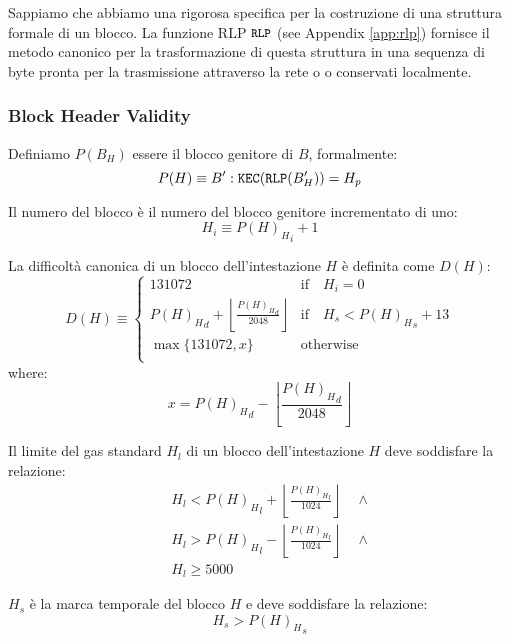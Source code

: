 \documentclass[9pt,oneside]{amsart}
\begin{document}
\begin{multicols}{2}
Sappiamo che abbiamo una rigorosa specifica per la costruzione di una struttura formale di un blocco. La funzione RLP $\texttt{\small RLP}$ (see Appendix \ref{app:rlp}) fornisce il metodo canonico per la trasformazione di questa struttura in una sequenza di byte pronta per la trasmissione attraverso la rete o o conservati localmente.

\subsubsection{Block Header Validity}

Definiamo $P(B_H)$ essere il blocco genitore di $B$, formalmente:
\begin{equation}
P(H) \equiv B': \mathtt{\tiny KEC}(\mathtt{\tiny RLP}(B'_H)) = H_p
\end{equation}

Il numero del blocco è il numero del blocco genitore incrementato di uno:
\begin{equation}
H_i \equiv {{P(H)_H}_i} + 1
\end{equation}

La difficoltà canonica di un blocco dell'intestazione $H$ è definita come $D(H)$:
\begin{equation}
D(H) \equiv \begin{cases}
131072 & \text{if} \quad H_i = 0\\
{P(H)_H}_d + \left\lfloor\frac{{P(H)_H}_d}{2048}\right\rfloor & \text{if} \quad H_s < {P(H)_H}_s + 13\\
\max \{ 131072, x \} & \text{otherwise}\\
\end{cases}
\end{equation}
where:
\begin{equation}
x = {P(H)_H}_d - \left\lfloor\frac{{P(H)_H}_d}{2048}\right\rfloor
\end{equation}

Il limite del gas standard $H_l$ di un blocco dell'intestazione $H$ deve soddisfare la relazione:
\begin{eqnarray}
& & H_l < {P(H)_H}_l + \left\lfloor\frac{{P(H)_H}_l}{1024}\right\rfloor \quad \wedge \\
& & H_l > {P(H)_H}_l - \left\lfloor\frac{{P(H)_H}_l}{1024}\right\rfloor \quad \wedge \\
& & H_l \geqslant 5000
\end{eqnarray}

$H_s$ è la marca temporale del blocco $H$ e deve soddisfare la relazione:
\begin{equation}
H_s > {P(H)_H}_s
\end{equation}


\end{multicols}
\end{document}
